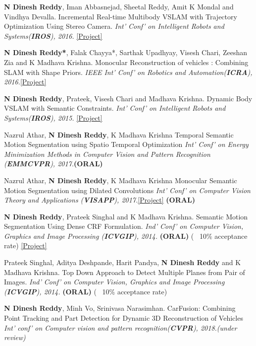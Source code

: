 \documentclass[a4paper,10pt]{article}
\begin{document}
\textbf{N Dinesh Reddy}, Iman Abbasnejad, Sheetal Reddy, Amit K Mondal and Vindhya Devalla. Incremental Real-time Multibody VSLAM with Trajectory Optimization Using Stereo Camera. {\sl Int' Conf' on Intelligent Robots and Systems(\textbf{IROS}), 2016.} \href{http://ieeexplore.ieee.org/document/7759663/}{[Project]}



\textbf{N Dinesh Reddy*}, Falak Chayya*, Sarthak Upadhyay, Visesh Chari, Zeeshan Zia and K Madhava Krishna. Monocular Reconstruction of vehicles : Combining SLAM with Shape Priors. {\sl IEEE Int' Conf' on Robotics and Automation(\textbf{ICRA}), 2016.}\href{http://robotics.iiit.ac.in/people/falak.chhaya/Monocular_Reconstruction_of_Vehicles.html}{[Project]}


\textbf{N Dinesh Reddy}, Prateek, Visesh Chari and Madhava Krishna. Dynamic Body VSLAM with Semantic Constraints. {\sl Int' Conf' on Intelligent Robots and Systems(\textbf{IROS}), 2015.} \href{https://researchweb.iiit.ac.in/~dineshreddy.n/zerotype/projects/DB-VSLAM/}{[Project]}

Nazrul Athar, \textbf{N Dinesh Reddy}, K Madhava Krishna Temporal Semantic Motion Segmentation using Spatio Temporal Optimization {\sl Int' Conf' on Energy Minimization Methods in Computer Vision and Pattern Recognition (\textbf{EMMCVPR}), 2017.}\textbf{(ORAL)} 

Nazrul Athar, \textbf{N Dinesh Reddy}, K Madhava Krishna Monocular Semantic Motion Segmentation using Dilated
Convolutions {\sl Int' Conf' on Computer Vision Theory and Applications (\textbf{VISAPP}), 2017.}\href{http://robotics.iiit.ac.in/people/nazrul.athar/SMS/} {[Project]} \textbf{(ORAL)} 

\textbf{N Dinesh Reddy}, Prateek Singhal and K Madhava Krishna. Semantic Motion Segmentation Using Dense CRF Formulation. {\sl Ind' Conf' on Computer Vision, Graphics and Image Processing (\textbf{ICVGIP}), 2014.} \textbf{(ORAL)} (~ 10\% acceptance rate) \href{https://researchweb.iiit.ac.in/~dineshreddy.n/zerotype/projects/SMS/} {[Project]}
 

 Prateek Singhal, Aditya Deshpande, Harit Pandya, \textbf{N Dinesh Reddy} and K Madhava Krishna. Top Down Approach to Detect Multiple Planes from Pair of Images. {\sl Ind' Conf' on Computer Vision, Graphics and Image Processing (\textbf{ICVGIP}), 2014.} \textbf{(ORAL)}  (~ 10\% acceptance rate)
 
 \textbf{N Dinesh Reddy}, Minh Vo, Srinivasa Narasimhan. CarFusion: Combining Point Tracking and Part Detection for Dynamic 3D Reconstruction of Vehicles {\sl Int' conf' on Computer vision and pattern recognition(\textbf{CVPR}), 2018.(under review)}
 
\end{document}
